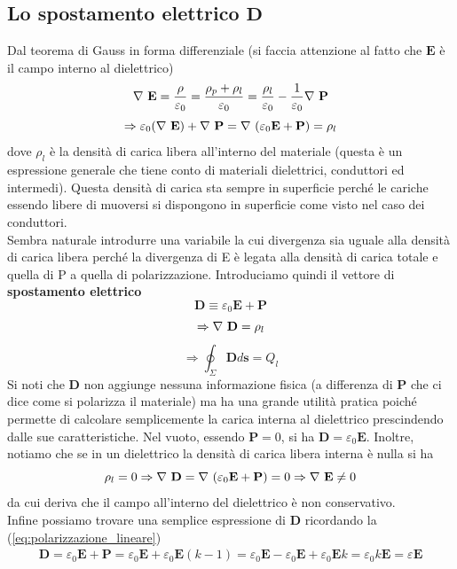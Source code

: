 \documentclass[
10pt, %
a4paper, %
oneside, %
headinclude,footinclude, %
BCOR5mm, %
]{scrartcl}
\begin{document}
\subsection{Lo spostamento elettrico $\mathbf{D}$}
Dal teorema di Gauss in forma differenziale (si faccia attenzione al fatto che $\mathbf{E}$ è il campo interno al dielettrico)
\[\mathbf{\nabla\ }\mathbf{E} = \frac{\rho}{\varepsilon_0} = \frac{\rho_p + \rho_l}{\varepsilon_0} = \frac{\rho_l}{\varepsilon_0}-\frac{1}{\varepsilon_0}\mathbf{\nabla\ }\mathbf{P}\]
\[\Rightarrow \varepsilon_0(\mathbf{\nabla\ }\mathbf{E})+\mathbf{\nabla\ }\mathbf{P} = \mathbf{\nabla\ }(\varepsilon_0\mathbf{E}+\mathbf{P})= \rho_l\]
dove $\rho_l$ è la densità di carica libera all'interno del materiale (questa è un espressione generale che tiene conto di materiali dielettrici, conduttori ed intermedi). Questa densità di carica sta sempre in superficie perché le cariche essendo libere di muoversi si dispongono in superficie come visto nel caso dei conduttori.\\
Sembra naturale introdurre una variabile la cui divergenza sia uguale alla densità di carica libera perché la divergenza di E è legata alla densità di carica totale e quella di P a quella di polarizzazione. Introduciamo quindi il vettore di \textbf{spostamento elettrico}
\[\mathbf{D} \equiv \varepsilon_0\mathbf{E}+\mathbf{P}\]
\[\Rightarrow \mathbf{\nabla\ }\mathbf{D} =\rho_l\]
\[\Rightarrow \oint_\Sigma\mathbf{D}d\mathbf{s} = Q_l\]
Si noti che $\mathbf{D}$ non aggiunge nessuna informazione fisica (a differenza di $\mathbf{P}$ che ci dice come si polarizza il materiale) ma ha una grande utilità pratica poiché permette di calcolare semplicemente la carica interna al dielettrico prescindendo dalle sue caratteristiche. Nel vuoto, essendo $\mathbf{P} = 0$, si ha $\mathbf{D} = \varepsilon_0\mathbf{E}$. Inoltre, notiamo che se in un dielettrico la densità di carica libera interna è nulla si ha
\[\rho_l = 0 \Rightarrow \mathbf{\nabla\ }\mathbf{D} =\mathbf{\nabla\ }(\varepsilon_0\mathbf{E}+\mathbf{P}) = 0 \Rightarrow \mathbf{\nabla\ }\mathbf{E}\neq 0\]
da cui deriva che il campo all'interno del dielettrico è non conservativo.\\
Infine possiamo trovare una semplice espressione di $\mathbf{D}$ ricordando la (\ref{eq:polarizzazione_lineare})
\begin{align}\label{eq:spostamento_elettrico}
\mathbf{D} = \varepsilon_0\mathbf{E}+\mathbf{P} = \varepsilon_0\mathbf{E}+ \varepsilon_0 \mathbf{E}(k-1)=  \varepsilon_0\mathbf{E}- \varepsilon_0 \mathbf{E}+\varepsilon_0 \mathbf{E}k=\varepsilon_0 k\mathbf{E} = \varepsilon \mathbf{E}
\end{align}
\end{document}
